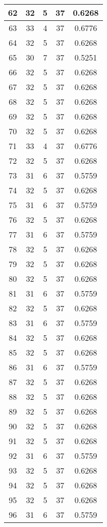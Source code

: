 \documentclass[letterpaper, 12pt]{article}
\begin{document}
\begin{longtable}{|c|c|c|c|c|}
\hline
62 & 32 & 5 & 37 & 0.6268 \\
\hline
63 & 33 & 4 & 37 & 0.6776 \\
\hline
64 & 32 & 5 & 37 & 0.6268 \\
\hline
65 & 30 & 7 & 37 & 0.5251 \\
\hline
66 & 32 & 5 & 37 & 0.6268 \\
\hline
67 & 32 & 5 & 37 & 0.6268 \\
\hline
68 & 32 & 5 & 37 & 0.6268 \\
\hline
69 & 32 & 5 & 37 & 0.6268 \\
\hline
70 & 32 & 5 & 37 & 0.6268 \\
\hline
71 & 33 & 4 & 37 & 0.6776 \\
\hline
72 & 32 & 5 & 37 & 0.6268 \\
\hline
73 & 31 & 6 & 37 & 0.5759 \\
\hline
74 & 32 & 5 & 37 & 0.6268 \\
\hline
75 & 31 & 6 & 37 & 0.5759 \\
\hline
76 & 32 & 5 & 37 & 0.6268 \\
\hline
77 & 31 & 6 & 37 & 0.5759 \\
\hline
78 & 32 & 5 & 37 & 0.6268 \\
\hline
79 & 32 & 5 & 37 & 0.6268 \\
\hline
80 & 32 & 5 & 37 & 0.6268 \\
\hline
81 & 31 & 6 & 37 & 0.5759 \\
\hline
82 & 32 & 5 & 37 & 0.6268 \\
\hline
83 & 31 & 6 & 37 & 0.5759 \\
\hline
84 & 32 & 5 & 37 & 0.6268 \\
\hline
85 & 32 & 5 & 37 & 0.6268 \\
\hline
86 & 31 & 6 & 37 & 0.5759 \\
\hline
87 & 32 & 5 & 37 & 0.6268 \\
\hline
88 & 32 & 5 & 37 & 0.6268 \\
\hline
89 & 32 & 5 & 37 & 0.6268 \\
\hline
90 & 32 & 5 & 37 & 0.6268 \\
\hline
91 & 32 & 5 & 37 & 0.6268 \\
\hline
92 & 31 & 6 & 37 & 0.5759 \\
\hline
93 & 32 & 5 & 37 & 0.6268 \\
\hline
94 & 32 & 5 & 37 & 0.6268 \\
\hline
95 & 32 & 5 & 37 & 0.6268 \\
\hline
96 & 31 & 6 & 37 & 0.5759 \\

\end{longtable}
\end{document}
